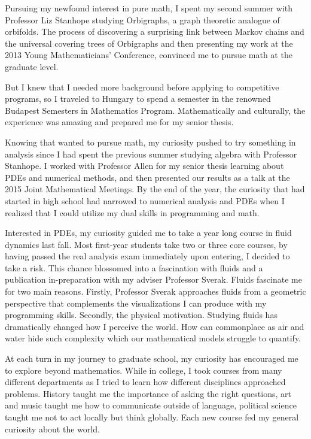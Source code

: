 \documentclass[12pt]{article}
\begin{document}
Pursuing my newfound interest in pure math, I spent my second summer with Professor Liz Stanhope studying Orbigraphs, a graph theoretic analogue of orbifolds. The process of discovering a surprising link between Markov chains and the universal covering trees of Orbigraphs and then presenting my work at the 2013 Young Mathematicians' Conference, convinced me to pursue math at the graduate level. 

But I knew that I needed more background before applying to competitive programs, so I traveled to Hungary to spend a semester in the renowned Budapest Semesters in Mathematics Program. Mathematically and culturally, the experience was amazing and prepared me for my senior thesis.

Knowing that wanted to pursue math, my curiosity pushed to try something in analysis since I had spent the previous summer studying algebra with Professor Stanhope. I worked with Professor Allen for my senior thesis learning about PDEs and numerical methods, and then presented our results as a talk at the 2015 Joint Mathematical Meetings. By the end of the year, the  curiosity that had started in high school had narrowed to numerical analysis and PDEs when I realized that I could utilize my dual skills in programming and math. 

Interested in PDEs, my curiosity guided me to take a year long course in fluid dynamics last fall. Most first-year students take two or three core courses, by having passed the real analysis exam immediately upon entering, I decided to take a risk. This chance blossomed into a fascination with fluids and a publication in-preparation with my adviser Professor Sverak. Fluids fascinate me for two main reasons. Firstly, Professor Sverak approaches fluids from a geometric perspective that complements the visualizations I can produce with my programming skills. Secondly, the physical motivation. Studying fluids has dramatically changed how I perceive the world. How can commonplace as air and water hide such complexity which our mathematical models struggle to quantify. 

At each turn in my journey to graduate school, my curiosity has encouraged me to explore beyond mathematics. While in college, I took courses from many different departments as I tried to learn how different disciplines approached problems. History taught me the importance of asking the right questions, art and music taught me how to communicate outside of language, political science taught me not to act locally but think globally. Each new course fed my general curiosity about the world.
\end{document}

